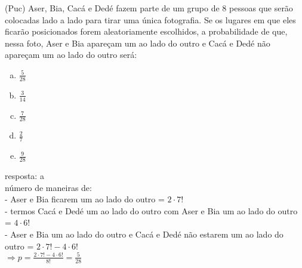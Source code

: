 \begin{ex}
 (Puc) Aser, Bia, Cacá e Dedé fazem parte de um grupo de 8 pessoas que serão colocadas lado a lado para tirar uma única fotografia. Se os lugares em que eles ficarão posicionados forem aleatoriamente escolhidos, a probabilidade de que, nessa foto, Aser e Bia apareçam um ao lado do outro e Cacá e Dedé não apareçam um ao lado do outro será:
   \begin{enumerate} [(a)]
       \item $\frac{5}{28}$
       \item $\frac{3}{14}$
       \item $\frac{7}{28}$
       \item $\frac{2}{7}$
       \item $\frac{9}{28}$
   \end{enumerate}
     \begin{sol}
     resposta: a \\
     número de maneiras de:\\
     - Aser e Bia ficarem um ao lado do outro = $2\cdot7!$\\
     - termos Cacá e Dedé um ao lado do outro com Aser e Bia um ao lado do outro = $4\cdot6!$\\
     - Aser e Bia um ao lado do  outro e Cacá e Dedé não estarem um ao lado do outro = $2\cdot7!-4\cdot6!$ \\
     $\Longrightarrow p=\frac{2\cdot7!-4\cdot6!}{8!}=\frac{5}{28}$
     \end{sol}
\end{ex}